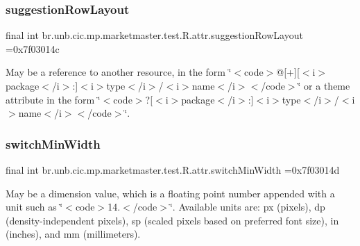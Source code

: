 \subsubsection{\texorpdfstring{suggestion\+Row\+Layout}{suggestionRowLayout}}
{\footnotesize\ttfamily final int br.\+unb.\+cic.\+mp.\+marketmaster.\+test.\+R.\+attr.\+suggestion\+Row\+Layout =0x7f03014c\hspace{0.3cm}{\ttfamily [static]}}

May be a reference to another resource, in the form \char`\"{}$<$code$>$@\mbox{[}+\mbox{]}\mbox{[}$<$i$>$package$<$/i$>$\+:\mbox{]}$<$i$>$type$<$/i$>$/$<$i$>$name$<$/i$>$$<$/code$>$\char`\"{} or a theme attribute in the form \char`\"{}$<$code$>$?\mbox{[}$<$i$>$package$<$/i$>$\+:\mbox{]}$<$i$>$type$<$/i$>$/$<$i$>$name$<$/i$>$$<$/code$>$\char`\"{}. \mbox{\label{classbr_1_1unb_1_1cic_1_1mp_1_1marketmaster_1_1test_1_1R_1_1attr_ad487f0ee0584408feb080cb004f44a74}} 
\subsubsection{\texorpdfstring{switch\+Min\+Width}{switchMinWidth}}
{\footnotesize\ttfamily final int br.\+unb.\+cic.\+mp.\+marketmaster.\+test.\+R.\+attr.\+switch\+Min\+Width =0x7f03014d\hspace{0.3cm}{\ttfamily [static]}}

May be a dimension value, which is a floating point number appended with a unit such as \char`\"{}$<$code$>$14.\+5sp$<$/code$>$\char`\"{}. Available units are\+: px (pixels), dp (density-\/independent pixels), sp (scaled pixels based on preferred font size), in (inches), and mm (millimeters). \mbox{\label{classbr_1_1unb_1_1cic_1_1mp_1_1marketmaster_1_1test_1_1R_1_1attr_a62ba8fca8428627992691480cc715d13}} 
